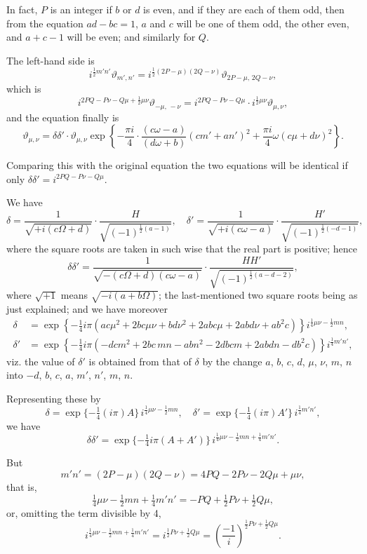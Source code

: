 \documentclass[11pt,a4paper]{article}
\theoremstyle{definition}
\begin{document}
In fact, $P$ is an integer if $b$ or $d$ is even, and if they are each of them odd, then from the equation $ad - bc = 1$, $a$ and $c$ will be one of them odd, the other even, and $a + c - 1$ will be even; and similarly for $Q$.

The left-hand side is
\[
i^{\frac{1}{2}m'n'}\vartheta_{m',n'} = i^{\frac{1}{2}(2P-\mu)(2Q-\nu)}\vartheta_{2P-\mu,\,2Q-\nu},
\]
which is
\[
i^{2PQ - P\nu - Q\mu + \frac{1}{2}\mu\nu}\vartheta_{-\mu,\,-\nu} = i^{2PQ - P\nu - Q\mu} \cdot i^{\frac{1}{2}\mu\nu}\vartheta_{\mu,\nu},
\]
and the equation finally is
\[
\vartheta_{\mu,\nu} = \delta\delta' \cdot \vartheta_{\mu,\nu} \exp\left\{-\frac{\pi i}{4}\cdot\frac{(c\omega - a)}{(d\omega + b)}(cm' + an')^2 + \frac{\pi i}{4}\omega(c\mu + d\nu)^2\right\}.
\]

Comparing this with the original equation the two equations will be identical if only $\delta\delta' = i^{2PQ - P\nu - Q\mu}$.

We have
\[
\delta = \frac{1}{\sqrt{+i(c\Omega + d)}} \cdot \frac{H}{\sqrt{(-1)^{\frac{1}{2}(a-1)}}}, \quad \delta' = \frac{1}{\sqrt{+i(c\omega - a)}} \cdot \frac{H'}{\sqrt{(-1)^{\frac{1}{2}(-d-1)}}},
\]
where the square roots are taken in such wise that the real part is positive; hence
\[
\delta\delta' = \frac{1}{\sqrt{-(c\Omega + d)(c\omega - a)}} \cdot \frac{HH'}{\sqrt{(-1)^{\frac{1}{2}(a-d-2)}}},
\]
where $\sqrt{+1}$ means $\sqrt{-i(a + b\Omega)}$; the last-mentioned two square roots being as just explained; and we have moreover
\begin{align*}
\delta &= \exp\left\{-\tfrac{1}{4}i\pi(ac\mu^2 + 2bc\mu\nu + bd\nu^2 + 2abc\mu + 2abd\nu + ab^2c)\right\}i^{\frac{1}{4}\mu\nu - \frac{1}{2}mn},\\
\delta' &= \exp\left\{-\tfrac{1}{4}i\pi(-dc m^2 + 2bc\,mn - ab n^2 - 2dbcm + 2abdn - db^2c)\right\}i^{\frac{1}{4}m'n'},
\end{align*}
viz. the value of $\delta'$ is obtained from that of $\delta$ by the change $a$, $b$, $c$, $d$, $\mu$, $\nu$, $m$, $n$ into $-d$, $b$, $c$, $a$, $m'$, $n'$, $m$, $n$.

Representing these by
\[
\delta = \exp\{-\tfrac{1}{4}(i\pi)A\}\,i^{\frac{1}{4}\mu\nu - \frac{1}{2}mn}, \quad \delta' = \exp\{-\tfrac{1}{4}(i\pi)A'\}\,i^{\frac{1}{4}m'n'},
\]
we have
\[
\delta\delta' = \exp\{-\tfrac{1}{4}i\pi(A + A')\}\,i^{\frac{1}{4}\mu\nu - \frac{1}{2}mn + \frac{1}{4}m'n'}.
\]

But
\[
m'n' = (2P - \mu)(2Q - \nu) = 4PQ - 2P\nu - 2Q\mu + \mu\nu,
\]
that is,
\[
\tfrac{1}{4}\mu\nu - \tfrac{1}{2}mn + \tfrac{1}{4}m'n' = -PQ + \tfrac{1}{2}P\nu + \tfrac{1}{2}Q\mu,
\]
or, omitting the term divisible by 4,
\[
i^{\frac{1}{4}\mu\nu - \frac{1}{2}mn + \frac{1}{4}m'n'} = i^{\frac{1}{2}P\nu + \frac{1}{2}Q\mu} = \left(\frac{-1}{i}\right)^{\frac{1}{2}P\nu + \frac{1}{2}Q\mu}.
\]
\end{document}
